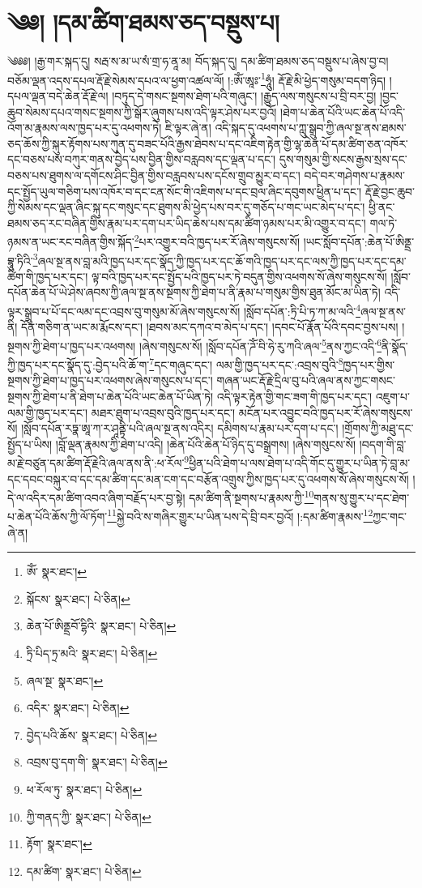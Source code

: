 \setcounter{footnote}{0} 
\chapter{༄༅། །དམ་ཚིག་ཐམས་ཅད་བསྡུས་པ།}༄༅༅། །རྒྱ་གར་སྐད་དུ། སརྦ་ས་མ་ཡ་སཾ་གྲ་ཧ་ནཱ་མ། བོད་སྐད་དུ། དམ་ཚིག་ཐམས་ཅད་བསྡུས་པ་ཞེས་བྱ་བ། བཅོམ་ལྡན་འདས་དཔལ་རྡོ་རྗེ་སེམས་དཔའ་ལ་ཕྱག་འཚལ་ལོ། །:ཨོཾ་ཨཱཿ་\footnote{ཨོཾ་  སྣར་ཐང་། }ཧཱུཾ། རྡོ་རྗེ་མི་ཕྱེད་གསུམ་བདག་ཉིད། །དཔལ་ལྡན་བདེ་ཆེན་རྡོ་རྗེ་ལ། །བཏུད་དེ་གསང་སྔགས་ཐེག་པའི་གཞུང་། །རྒྱུད་ལས་གསུངས་པ་བྲི་བར་བྱ། །བྱང་ཆུབ་སེམས་དཔའ་གསང་སྔགས་ཀྱི་སྒོར་ཞུགས་པས་འདི་ལྟར་ཤེས་པར་བྱའོ། །ཐེག་པ་ཆེན་པོའི་ཡང་ཆེན་པོ་འདི་འོག་མ་རྣམས་ལས་ཁྱད་པར་དུ་འཕགས་ཏེ། ཇི་ལྟར་ཞེ་ན། འདི་སྐད་དུ་འཕགས་པ་ཀླུ་སྒྲུབ་ཀྱི་ཞལ་སྔ་ནས་ཐམས་ཅད་ཆོས་ཀྱི་སྐུར་རྟོགས་པས་ཀུན་དུ་བཟང་པོའི་རྒྱས་ཐེབས་པ་དང་འཇིག་རྟེན་གྱི་ལྷ་ཆེན་པོ་དམ་ཚིག་ཅན་འཁོར་དང་བཅས་པས་བཀུར་གནས་བྱེད་པས་བྱིན་གྱིས་བརླབས་དང་ལྡན་པ་དང་། དུས་གསུམ་གྱི་སངས་རྒྱས་སྲས་དང་བཅས་པས་ཐུགས་ལ་དགོངས་ཤིང་བྱིན་གྱིས་བརླབས་པས་དངོས་གྲུབ་མྱུར་བ་དང་། བདེ་བར་གཤེགས་པ་རྣམས་དང་སྤྱོད་ཡུལ་གཅིག་པས་འཁོར་བ་དང་ངན་སོང་གི་འཇིགས་པ་དང་བྲལ་ཞིང་དབུགས་ཕྱིན་པ་དང་། རྡོ་རྗེ་བྱང་ཆུབ་ཀྱི་སེམས་དང་ལྡན་ཞིང་སྐུ་དང་གསུང་དང་ཐུགས་མི་ཕྱེད་པས་བར་དུ་གཅོད་པ་གང་ཡང་མེད་པ་དང་། ཕྱི་ནང་ཐམས་ཅད་རང་བཞིན་གྱིས་རྣམ་པར་དག་པར་ཡིད་ཆེས་པས་དམ་ཚིག་ཉམས་པར་མི་འགྱུར་བ་དང་། གལ་ཏེ་ཉམས་ན་ཡང་རང་བཞིན་གྱིས་སྐོད་\footnote{སྐོངས་  སྣར་ཐང་།  པེ་ཅིན། }པར་འགྱུར་བའི་ཁྱད་པར་རོ་ཞེས་གསུངས་སོ། །ཡང་སློབ་དཔོན་:ཆེན་པོ་ཨིནྡྲ་བྷཱུ་ཏིའི་\footnote{ཆེན་པོ་ཨིནྡྲབོ་དྷིའི་  སྣར་ཐང་།  པེ་ཅིན། }ཞལ་སྔ་ནས་བླ་མའི་ཁྱད་པར་དང་སྣོད་ཀྱི་ཁྱད་པར་དང་ཆོ་གའི་ཁྱད་པར་དང་ལས་ཀྱི་ཁྱད་པར་དང་དམ་ཚིག་གི་ཁྱད་པར་དང་། ལྟ་བའི་ཁྱད་པར་དང་སྤྱོད་པའི་ཁྱད་པར་ཏེ་བདུན་གྱིས་འཕགས་སོ་ཞེས་གསུངས་སོ། །སློབ་དཔོན་ཆེན་པོ་ཡེ་ཤེས་ཞབས་ཀྱི་ཞལ་སྔ་ནས་སྔགས་ཀྱི་ཐེག་པ་ནི་རྣམ་པ་གསུམ་གྱིས་ཐུན་མོང་མ་ཡིན་ཏེ། འདི་ལྟར་སྒྲུབ་པ་པོ་དང་ལམ་དང་འབྲས་བུ་གསུམ་མོ་ཞེས་གསུངས་སོ། །སློབ་དཔོན་:ཏྲི་པི་ཏ་ཀ་མ་ལའི་\footnote{ཏྲི་པིད་ཏྲ་མའི་  སྣར་ཐང་།  པེ་ཅིན། }ཞལ་སྔ་ནས་ནི། དོན་གཅིག་ན་ཡང་མ་རྨོངས་དང་། །ཐབས་མང་དཀའ་བ་མེད་པ་དང་། །དབང་པོ་རྣོན་པོའི་དབང་བྱས་པས། །སྔགས་ཀྱི་ཐེག་པ་ཁྱད་པར་འཕགས། །ཞེས་གསུངས་སོ། །སློབ་དཔོན་ཌོཾ་བི་ཧེ་རུ་ཀའི་ཞལ་\footnote{ཞལ་སྔ་  སྣར་ཐང་། }ནས་ཀྱང་འདི་\footnote{འདིར་  སྣར་ཐང་།  པེ་ཅིན། }ནི་སྣོད་ཀྱི་ཁྱད་པར་དང་སྣོད་དུ་:བྱེད་པའི་ཆོ་ག་\footnote{བྱེད་པའི་ཆོས་  སྣར་ཐང་།  པེ་ཅིན། }དང་གཞུང་དང་། ལམ་གྱི་ཁྱད་པར་དང་:འབྲས་བུའི་\footnote{འབྲས་བུ་དག་གི་  སྣར་ཐང་།  པེ་ཅིན། }ཁྱད་པར་གྱིས་སྔགས་ཀྱི་ཐེག་པ་ཁྱད་པར་འཕགས་ཞེས་གསུངས་པ་དང་། གཞན་ཡང་རྡོ་རྗེ་དྲིལ་བུ་པའི་ཞལ་ནས་ཀྱང་གསང་སྔགས་ཀྱི་ཐེག་པ་ནི་ཐེག་པ་ཆེན་པོའི་ཡང་ཆེན་པོ་ཡིན་ཏེ། འདི་ལྟར་རྟེན་གྱི་གང་ཟག་གི་ཁྱད་པར་དང་། འཇུག་པ་ལམ་གྱི་ཁྱད་པར་དང་། མཐར་ཐུག་པ་འབྲས་བུའི་ཁྱད་པར་དང་། མངོན་པར་འབྱུང་བའི་ཁྱད་པར་རོ་ཞེས་གསུངས་སོ། །སློབ་དཔོན་རཏྣ་ཨཱ་ཀ་ར་ཤཱནྟི་པའི་ཞལ་སྔ་ནས་འདིར། དམིགས་པ་རྣམ་པར་དག་པ་དང་། །གྲོགས་ཀྱི་མཐུ་དང་སྤྱོད་པ་ཡིས། །བློ་ལྡན་རྣམས་ཀྱི་ཐེག་པ་འདི། །ཆེན་པོའི་ཆེན་པོ་ཉིད་དུ་བསྒྲགས། །ཞེས་གསུངས་སོ། །བདག་གི་བླ་མ་རྗེ་བཙུན་དམ་ཚིག་རྡོ་རྗེའི་ཞལ་ནས་ནི་:ཕ་རོལ་\footnote{ཕ་རོལ་ཏུ་  སྣར་ཐང་།  པེ་ཅིན། }ཕྱིན་པའི་ཐེག་པ་ལས་ཐེག་པ་འདི་གོང་དུ་གྱུར་པ་ཡིན་ཏེ་བླ་མ་དང་དབང་བསྐུར་བ་དང་དམ་ཚིག་དང་མན་ངག་དང་བརྩོན་འགྲུས་ཀྱིས་ཁྱད་པར་དུ་འཕགས་སོ་ཞེས་གསུངས་སོ། །དེ་ལ་འདིར་དམ་ཚིག་འབའ་ཞིག་བརྗོད་པར་བྱ་སྟེ། དམ་ཚིག་ནི་སྔགས་པ་རྣམས་ཀྱི་\footnote{ཀྱི་གནད་ཀྱི་  སྣར་ཐང་།  པེ་ཅིན། }གནས་སུ་གྱུར་པ་དང་ཐེག་པ་ཆེན་པོའི་ཆོས་ཀྱི་ལོ་ཏོག་\footnote{རྟོག་  སྣར་ཐང་། }སྐྱེ་བའི་ས་གཞིར་གྱུར་པ་ཡིན་པས་དེ་བྲི་བར་བྱའོ། །:དམ་ཚིག་རྣམས་\footnote{དམ་ཚིག་  སྣར་ཐང་།  པེ་ཅིན། }ཀྱང་གང་ཞེ་ན། 